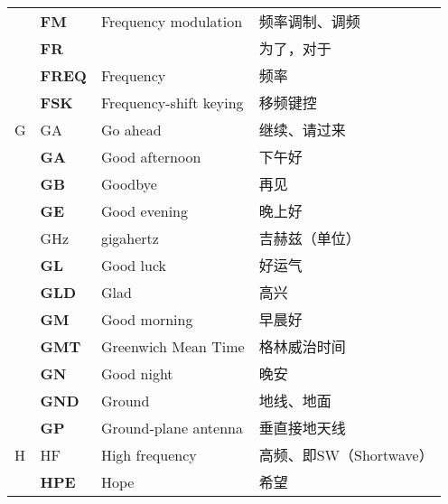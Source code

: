 \begin{longtable}[l]{llll}
    & \textbf{FM}                       & Frequency modulation                    & 频率调制、调频             \\
    & \textbf{FR}                       &                                         & 为了，对于               \\
    & \textbf{FREQ}                     & Frequency                               & 频率                  \\
    & \textbf{FSK}                      & Frequency-shift keying                  & 移频键控                \\
  G & GA                                & Go ahead                                & 继续、请过来              \\
    & \textbf{GA}                       & Good afternoon                          & 下午好                 \\
    & \textbf{GB}                       & Goodbye                                 & 再见                  \\
    & \textbf{GE}                       & Good evening                            & 晚上好                 \\
    & \unit{\GHz}                       & gigahertz                               & 吉赫兹（单位）             \\
    & \textbf{GL}                       & Good luck                               & 好运气                 \\
    & \textbf{GLD}                      & Glad                                    & 高兴                  \\
    & \textbf{GM}                       & Good morning                            & 早晨好                 \\
    & \textbf{GMT}                      & Greenwich Mean Time                     & 格林威治时间              \\ %
    & \textbf{GN}                       & Good night                              & 晚安                  \\
    & \textbf{GND}                      & Ground                                  & 地线、地面               \\
    & \textbf{GP}                       & Ground-plane antenna                    & 垂直接地天线              \\
  H & HF                                & High frequency                          & 高频、即SW（Shortwave）   \\
    & \textbf{HPE}                      & Hope                                    & 希望                  \\

\end{longtable}
